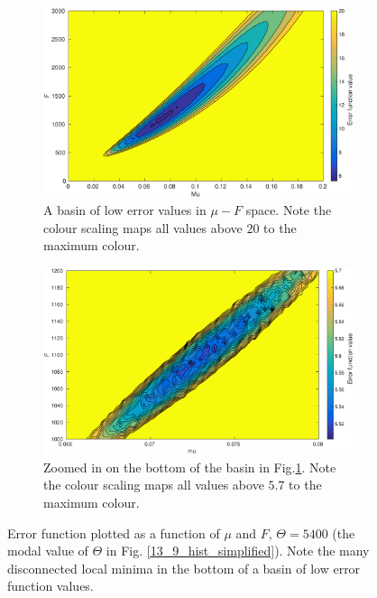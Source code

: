 \documentclass[10pt,journal]{./IEEE_latex_class/IEEEtran}
\begin{document}
 \begin{figure}[t!]	
	\begin{subfigure}[h]{0.49\textwidth}
    \centering
        \includegraphics[scale = 0.24 ,clip = true, trim = 55 0 0 0]{Likelihood_profile_rough}
        \caption{ A basin of low error values in $\mu - F$ space. Note the colour scaling maps all values above $20$ to the maximum colour.}
        \label{Likelihood_profile_rough} 
    \end{subfigure}
    	\begin{subfigure}[h]{0.49\textwidth}
    \centering
        \includegraphics[scale = 0.24 ,clip = true, trim = 55 0 0 0]{Likelihood_profile_fine}
        \caption{Zoomed in on the bottom of the basin in Fig.\ref{Likelihood_profile_rough}. Note the colour scaling maps all values above $5.7$ to the maximum colour.}
        \label{Likelihood_profile_fine} 
    \end{subfigure}
    \caption{Error function plotted as a function of $\mu$ and $F$, $\Theta = 5400$ (the modal value of $\Theta$ in Fig. \ref{13_9_hist_simplified}). Note the many disconnected local minima in the bottom of a basin of low error function values.} 
\label{SimplifiedModelLikelihood}   
\end{figure}
  
\end{document}
